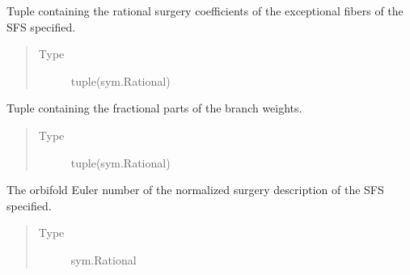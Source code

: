 \documentclass[letterpaper,10pt,english]{sphinxmanual}
\begin{document}
\begin{fulllineitems}
\begin{fulllineitems}
\begin{quote}
\begin{description}
\end{description}\end{quote}

\end{fulllineitems}


\begin{fulllineitems}
\label{\detokenize{soapy:soapy.SFS.branch_weights}}
\sphinxAtStartPar
Tuple containing the rational surgery coefficients of the exceptional fibers of the SFS specified.
\begin{quote}\begin{description}
\item[{Type}] \leavevmode
\sphinxAtStartPar
tuple(sym.Rational)

\end{description}\end{quote}

\end{fulllineitems}


\begin{fulllineitems}
\label{\detokenize{soapy:soapy.SFS.fractional_branch_weights}}
\sphinxAtStartPar
Tuple containing the fractional parts of the branch weights.
\begin{quote}\begin{description}
\item[{Type}] \leavevmode
\sphinxAtStartPar
tuple(sym.Rational)

\end{description}\end{quote}

\end{fulllineitems}


\begin{fulllineitems}
\label{\detokenize{soapy:soapy.SFS.euler_number}}
\sphinxAtStartPar
The orbifold Euler number of the normalized surgery description of the SFS specified.
\begin{quote}\begin{description}
\item[{Type}] \leavevmode
\sphinxAtStartPar
sym.Rational


\end{description}
\end{quote}
\end{fulllineitems}
\end{fulllineitems}
\end{document}
